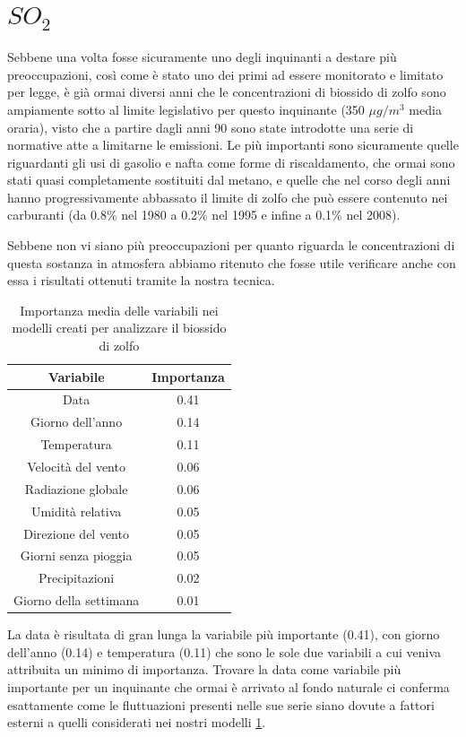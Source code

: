\documentclass[a4paper]{report}
\begin{document}
\section{$SO_2$}
Sebbene una volta fosse sicuramente uno degli inquinanti a destare più preoccupazioni, così come è stato uno dei primi ad essere monitorato e limitato per legge, è già ormai diversi anni che le concentrazioni di biossido di zolfo sono ampiamente sotto al limite legislativo per questo inquinante (350 $\mu g/m^3$ media oraria), visto che a partire dagli anni 90 sono state introdotte una serie di normative atte a limitarne le emissioni. Le più importanti sono sicuramente quelle riguardanti gli usi di gasolio e nafta come forme di riscaldamento, che ormai sono stati quasi
completamente sostituiti dal metano, e quelle che nel corso degli anni hanno progressivamente abbassato il limite di zolfo che può essere contenuto nei carburanti (da 0.8\% nel 1980 a 0.2\% nel 1995 e infine a 0.1\% nel 2008).

Sebbene non vi siano più preoccupazioni per quanto riguarda le concentrazioni di questa sostanza in atmosfera abbiamo ritenuto che fosse utile verificare anche con essa i risultati ottenuti tramite la nostra tecnica. 

\begin{table}[h!]
\centering
\begin{tabular}{ |c c| }
	\hline
	Variabile & Importanza \\
	\hline
	Data & 0.41 \\
	Giorno dell'anno & 0.14 \\
	Temperatura & 0.11 \\
	Velocità del vento & 0.06 \\
	Radiazione globale & 0.06 \\
	Umidità relativa & 0.05 \\
	Direzione del vento & 0.05 \\
	Giorni senza pioggia & 0.05 \\
	Precipitazioni & 0.02 \\
	Giorno della settimana & 0.01 \\
	\hline
\end{tabular}
\caption{Importanza media delle variabili nei modelli creati per analizzare il biossido di zolfo}
\label{table:importanza_so2}
\end{table}

La data è risultata di gran lunga la variabile più importante (0.41), con giorno dell'anno (0.14) e temperatura (0.11) che sono le sole due variabili a cui veniva attribuita un minimo di importanza. Trovare la data come variabile più importante per un inquinante che ormai è arrivato al fondo naturale ci conferma esattamente come le fluttuazioni presenti nelle sue serie siano dovute a fattori esterni a quelli considerati nei nostri modelli \ref{table:importanza_so2}.
\end{document}
